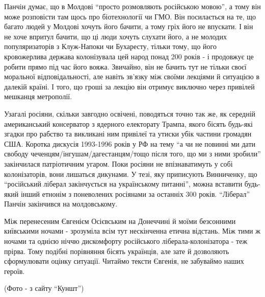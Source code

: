 Панчін думає, що в Молдові \enquote{просто розмовляють російською мовою}, а тому він
може розповісти там щось про біотехнології чи ГМО. Він посилається на те, що
багато людей у Молдові хочуть його бачити, а тому гріх його не впускати. І він
не хоче впритул бачити, що ці люди хочуть слухати його, а не молодих
популяризаторів з Клуж-Напоки чи Бухаресту, тільки тому, що його кровожерлива
держава колонізувала цей народ понад 200 років - і продовжує це робити прямо
під час його вояжа. Звичайно, він не бачить тут не тільки своєї моральної
відповідальності, але навіть зв'язку між своїми лекціями й ситуацією в далекій
країні. І того, що гроші за лекцію він отримує виключно через привілей мешканця
метрополії.

Узагалі росіяни, скільки завгодно освічені, поводяться точно так же, як
середній американський консерватор з ядерного електорату Трампа, якого бісять
будь-які згадки про рабство та викликані ним привілеї та утиски убік частини
громадян США. Коротка дискусія 1993-1996 років у РФ на тему \enquote{а чи не повинні ми
дати свободу чеченцям/інгушам/дагестанцям/тощо після того, що ми з ними
зробили} закінчилася патріотичним угаром. Поки росіяни не впізнаватимуть у собі
колонізаторів, вони лишаться дикунами. У тезі, яку приписують Винниченку, що
\enquote{російський ліберал закінчується на українському питанні}, можна вставити
будь-який інший етнонім з поневолених росіянами за останніх 300 років.
\enquote{Ліберал} Панчін закінчився на молдовському.

Між перенесеним Євгенієм Осієвським на Донеччині й моїми безсонними київськими
ночами - зрозуміла всім тут нескінченна етична відстань. Між тими ж ночами та
однією ніччю дискомфорту російського ліберала-колонізатора - теж прірва. Тому
подібні порівняння бісять українців, але зате й дозволяють сформулювати оцінку
ситуації. Читаймо тексти Євгенія, не забуваймо наших героїв.

(Фото - з сайту \enquote{Куншт})
